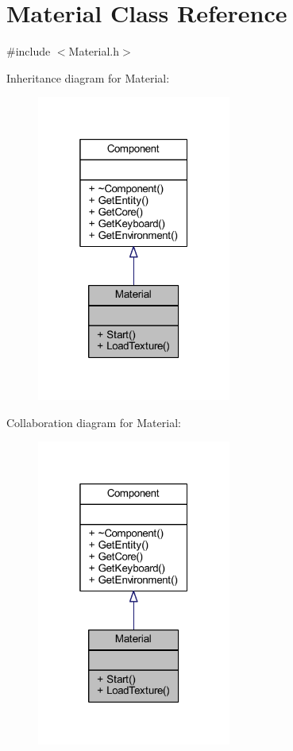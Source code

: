 \hypertarget{class_material}{}\section{Material Class Reference}
\label{class_material}


{\ttfamily \#include $<$Material.\+h$>$}



Inheritance diagram for Material\+:
\nopagebreak
\begin{figure}[H]
\begin{center}
\leavevmode
\includegraphics[width=181pt]{class_material__inherit__graph}
\end{center}
\end{figure}


Collaboration diagram for Material\+:
\nopagebreak
\begin{figure}[H]
\begin{center}
\leavevmode
\includegraphics[width=181pt]{class_material__coll__graph}
\end{center}
\end{figure}
